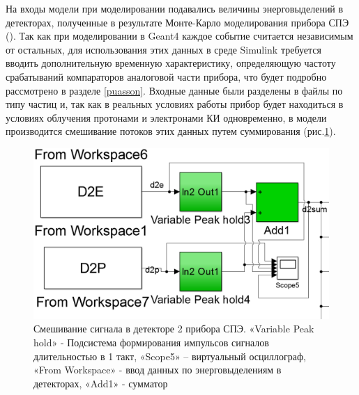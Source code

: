 На входы модели при моделировании подавались величины энерговыделений в детекторах, полученные в результате Монте-Карло моделирования прибора СПЭ (). Так как при моделировании в Geant4 каждое событие считается независимым от остальных, для использования этих данных в среде Simulink требуется вводить дополнительную временную характеристику, определяющую частоту срабатываний компараторов аналоговой части прибора, что будет подробно рассмотрено в разделе \ref{puasson}. 
Входные данные были разделены в файлы по типу частиц и, так как в реальных условиях работы прибор будет находиться в условиях облучения протонами и электронами КИ одновременно, в модели производится смешивание потоков этих данных путем суммирования (рис.\ref{fig:simulink_summ}).
\begin{figure}
\centering
\includegraphics[width=0.7\linewidth]{images/simulink_summ}
\caption{Смешивание сигнала в детекторе 2 прибора СПЭ. «Variable Peak hold» - Подсистема формирования импульсов сигналов длительностью в 1 такт, «Scope5» – виртуальный осциллограф, «From Workspace» - ввод данных по энерговыделениям в детекторах, «Add1» - сумматор}
\label{fig:simulink_summ}
\end{figure}






